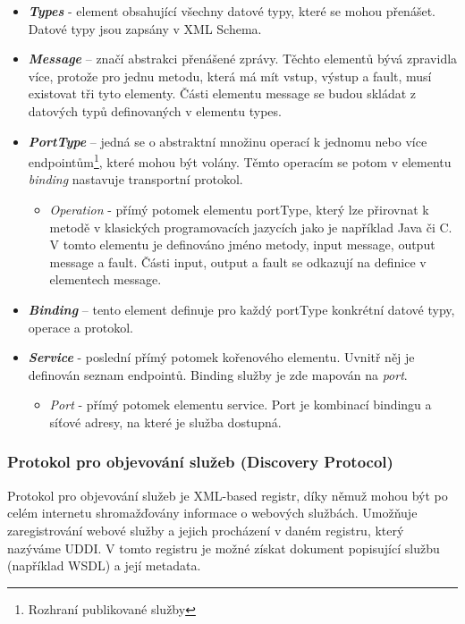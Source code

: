 \documentclass[11pt,twoside,a4paper]{book}
\begin{document}
\begin{itemize}
  \item \textbf{\textit{Types}} - element obsahující všechny datové typy,
  které se mohou přenášet. Datové typy jsou zapsány v XML Schema.

  \item \textbf{\textit{Message}} – značí abstrakci přenášené zprávy.
  Těchto elementů bývá zpravidla více, protože pro jednu metodu, která má mít
  vstup, výstup a fault, musí existovat tři tyto
elementy. Části elementu message se budou skládat z datových typů definovaných v
 elementu types.

  \item \textbf{\textit{PortType}} – jedná se o abstraktní množinu operací k
  jednomu nebo více endpointům\footnote{Rozhraní publikované služby}, které
  mohou být volány.
  Těmto operacím se potom v elementu \textit{binding} nastavuje transportní protokol.

  \begin{itemize}
    \item \textit{Operation} - přímý potomek elementu portType,
    který lze přirovnat k metodě v klasických programovacích jazycích jako je například Java či C. V tomto
elementu je definováno jméno metody, input message, output message a fault.
Části input, output a fault se odkazují na definice v elementech message.

  \end{itemize}
  \item \textbf{\textit{Binding}} – tento element definuje pro každý
  portType konkrétní datové typy, operace a protokol.

  \item \textbf{\textit{Service}} - poslední přímý potomek kořenového
  elementu. Uvnitř něj je definován seznam endpointů. Binding služby je zde
  mapován na \textit{port}.

  \begin{itemize}
    \item \textit{Port} - přímý potomek elementu service. Port je
    kombinací bindingu a síťové adresy, na které je služba dostupná.

  \end{itemize}
\end{itemize}

\subsubsection{Protokol pro objevování služeb (Discovery Protocol)}
Protokol pro objevování služeb je XML-based registr, díky němuž mohou být po celém
internetu shromažďovány informace o webových službách. Umožňuje zaregistrování webové
služby a jejich procházení v daném registru, který nazýváme UDDI. V tomto registru je
možné získat dokument popisující službu (například WSDL) a její metadata.
\end{document}
